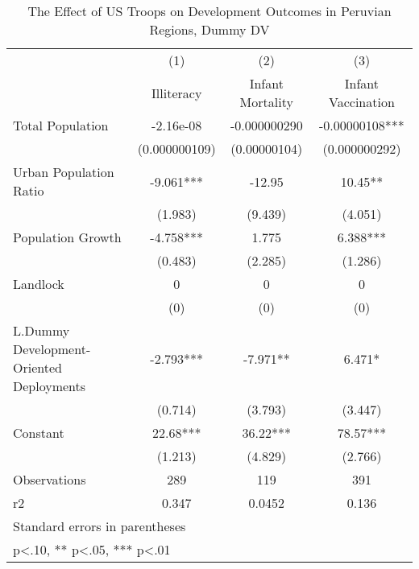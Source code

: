 \documentclass[12pt]{article}
\begin{document}
\begin{table}[htbp]\centering
\def\sym#1{\ifmmode^{#1}\else\(^{#1}\)\fi}
\caption{The Effect of US Troops on Development Outcomes in Peruvian Regions, Dummy DV}
\begin{tabular}{l*{3}{c}}
\hline\hline
                    &\multicolumn{1}{c}{(1)}&\multicolumn{1}{c}{(2)}&\multicolumn{1}{c}{(3)}\\
                    &\multicolumn{1}{c}{Illiteracy}&\multicolumn{1}{c}{Infant Mortality}&\multicolumn{1}{c}{Infant Vaccination}\\
\hline
Total Population    &   -2.16e-08   &-0.000000290   & -0.00000108***\\
                    &(0.000000109)   &(0.00000104)   &(0.000000292)   \\
[1em]
Urban Population Ratio&      -9.061***&      -12.95   &       10.45** \\
                    &     (1.983)   &     (9.439)   &     (4.051)   \\
[1em]
Population Growth   &      -4.758***&       1.775   &       6.388***\\
                    &     (0.483)   &     (2.285)   &     (1.286)   \\
[1em]
Landlock            &           0   &           0   &           0   \\
                    &         (0)   &         (0)   &         (0)   \\
[1em]
L.Dummy Development-Oriented Deployments&      -2.793***&      -7.971** &       6.471*  \\
                    &     (0.714)   &     (3.793)   &     (3.447)   \\
[1em]
Constant            &       22.68***&       36.22***&       78.57***\\
                    &     (1.213)   &     (4.829)   &     (2.766)   \\
\hline
Observations        &         289   &         119   &         391   \\
r2                  &       0.347   &      0.0452   &       0.136   \\
\hline\hline
\multicolumn{4}{l}{\footnotesize Standard errors in parentheses}\\
\multicolumn{4}{l}{\footnotesize * p<.10, ** p<.05, *** p<.01}\\
\end{tabular}
\end{table}
\end{document}
